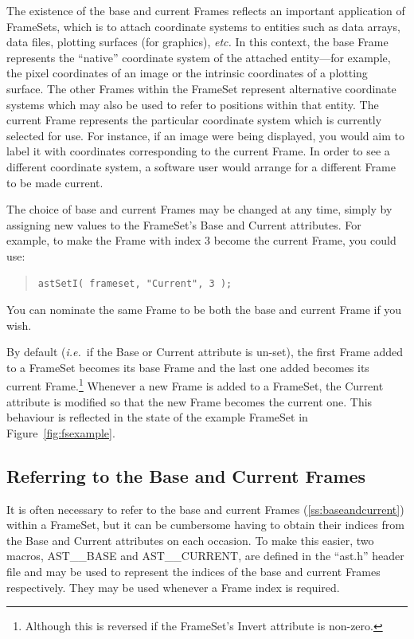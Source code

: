 \documentclass[twoside,11pt]{article}
\newcommand{\htmlref}[2]{#1}
\newcommand{\secref}[1]{\S\ref{#1}}
\renewcommand{\secref}[1]{\ref{#1}}
\begin{document}
The existence of the base and current Frames reflects an important
application of FrameSets, which is to attach coordinate systems to
entities such as data arrays, data files, plotting surfaces (for
graphics), {\em{etc.}}  In this context, the base Frame represents the
``native'' coordinate system of the attached entity---for example, the
pixel coordinates of an image or the intrinsic coordinates of a
plotting surface. The other Frames within the FrameSet represent
alternative coordinate systems which may also be used to refer to
positions within that entity.  The current Frame represents the
particular coordinate system which is currently selected for use. For
instance, if an image were being displayed, you would aim to label it
with coordinates corresponding to the current Frame. In order to see a
different coordinate system, a software user would arrange for a
different Frame to be made current.

The choice of base and current Frames may be changed at any time,
simply by assigning new values to the FrameSet's Base and Current
attributes. For example, to make the Frame with index 3 become the
current Frame, you could use:

\begin{quote}
\small
\begin{verbatim}
astSetI( frameset, "Current", 3 );
\end{verbatim}
\normalsize
\end{quote}

You can nominate the same Frame to be both the base and current Frame
if you wish.
\label{ss:baseandcurrentdefault}

By default ({\em{i.e.}}\ if the Base or Current attribute is un-set),
the first Frame added to a FrameSet becomes its base Frame and the
last one added becomes its current Frame.\footnote{Although this is
reversed if the FrameSet's \htmlref{Invert}{Invert} attribute is non-zero.} Whenever a
new Frame is added to a FrameSet, the Current attribute is modified so
that the new Frame becomes the current one. This behaviour is
reflected in the state of the example FrameSet in
Figure~\ref{fig:fsexample}.

\subsection{\label{ss:astbaseandastcurrent}Referring to the Base and Current Frames}

It is often necessary to refer to the base and current Frames
(\secref{ss:baseandcurrent}) within a \htmlref{FrameSet}{FrameSet}, but it can be
cumbersome having to obtain their indices from the \htmlref{Base}{Base} and \htmlref{Current}{Current}
attributes on each occasion. To make this easier, two macros,
AST\_\_BASE and AST\_\_CURRENT, are defined in the ``ast.h'' header
file and may be used to represent the indices of the base and current
Frames respectively. They may be used whenever a \htmlref{Frame}{Frame} index is
required.
\end{document}
